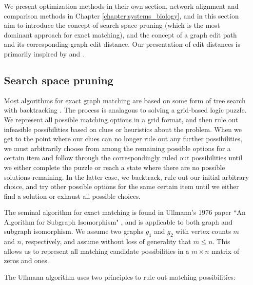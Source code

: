 \documentclass[12pt]{thesis}
\theoremstyle{plain}
\theoremstyle{definition}
\theoremstyle{remark}
\begin{document}
We present optimization methods in their own section, network alignment and comparison methods in Chapter \ref{chapter:systems_biology}, and in this section aim to introduce the concept of search space pruning (which is the most dominant approach for exact matching), and the concept of a graph edit path and its corresponding graph edit distance. Our presentation of edit distances is primarily inspired by \cite{Livi_2012} and \cite{Riesen_2009}.

\subsection{Search space pruning}

Most algorithms for exact graph matching are based on some form of tree search with backtracking \cite{Conte_2004}. The process is analagous to  solving a grid-based logic puzzle. We represent all possible matching options in a grid format, and then rule out infeasible possibilities based on clues or heuristics about the problem. When we get to the point where our clues can no longer rule out any further possibilities, we must arbitrarily choose from among the remaining possible options for a certain item and follow through the correspondingly ruled out possibilities until we either complete the puzzle or reach a state where there are no possible solutions remaining. In the latter case, we backtrack, rule out our initial arbitrary choice, and try other possible options for the same certain item until we either find a solution or exhaust all possible choices.

The seminal algorithm for exact matching is found in Ullmann's 1976 paper ``An Algorithm for Subgraph Isomorphism" \cite{Ullmann_1976}, and is applicable to both graph and subgraph isomorphism. We assume two graphs $g_1$ and $g_2$ with vertex counts $m$ and $n$, respectively, and assume without loss of generality that $m\leq n$. This allows us to represent all matching candidate possibilities in a $m\times n$ matrix of zeros and ones.

The Ullmann algorithm uses two principles to rule out matching possibilities:
\end{document}
